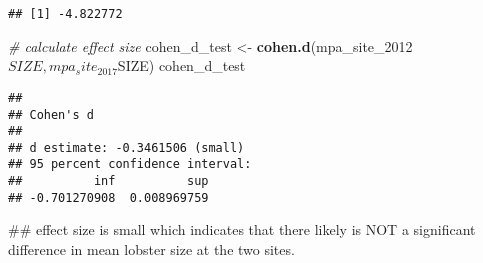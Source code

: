 \documentclass[]{article}
\newenvironment{Shaded}{\begin{snugshade}}{\end{snugshade}}
\newcommand{\KeywordTok}[1]{\textcolor[rgb]{0.13,0.29,0.53}{\textbf{{#1}}}}
\newcommand{\DecValTok}[1]{\textcolor[rgb]{0.00,0.00,0.81}{{#1}}}
\newcommand{\StringTok}[1]{\textcolor[rgb]{0.31,0.60,0.02}{{#1}}}
\newcommand{\CommentTok}[1]{\textcolor[rgb]{0.56,0.35,0.01}{\textit{{#1}}}}
\newcommand{\NormalTok}[1]{{#1}}
\begin{document}
\begin{Shaded}
\end{Shaded}

\begin{verbatim}
## [1] -4.822772
\end{verbatim}

\begin{Shaded}
\begin{Highlighting}[]
\CommentTok{# calculate effect size}
\NormalTok{cohen_d_test <-}\StringTok{ }\KeywordTok{cohen.d}\NormalTok{(mpa_site_2012$SIZE, mpa_site_2017$SIZE)}
\NormalTok{cohen_d_test}
\end{Highlighting}
\end{Shaded}

\begin{verbatim}
## 
## Cohen's d
## 
## d estimate: -0.3461506 (small)
## 95 percent confidence interval:
##          inf          sup 
## -0.701270908  0.008969759
\end{verbatim}

\begin{Shaded}
\begin{Highlighting}[]
\NormalTok{## effect size is small which indicates that there likely is NOT a significant difference in mean lobster size at the two sites.}
\end{Highlighting}
\end{Shaded}
\end{document}
